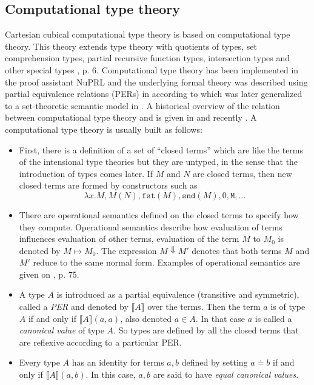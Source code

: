 \documentclass[12pt,a4paper,twoside,xetex]{book} %
\newcommand{\keyword}[1]{\emph{#1}\index{#1}}
\begin{document}
\subsection{Computational type theory}

Cartesian cubical computational type theory is based on computational type theory. This theory extends type theory with quotients of types, set 
comprehension types, partial recursive function types, intersection types and 
other special types \cite{Constable2011}, p. 6.  Computational type theory has 
been implemented in the proof assistant NuPRL and the underlying formal theory 
was described using partial equivalence relations (PERs) in \cite{Allen1987} 
according to \cite{Angiuli2018} which was later generalized to a set-theoretic semantic model in 
\cite{Harper1991}. A historical overview of the relation between computational type theory and  is given in \cite{Constable2003} and recently 
\cite{Constable2015July}. A computational type theory is usually built as 
follows:

\begin{itemize}
 \item First, there is a definition of a set of ``closed terms'' which are like 
the terms of the intensional type theories but they are untyped, in the sense 
that the introduction of types comes later. If $M$ and $N$ are closed terms, 
then new closed terms are formed by constructors such as $$\lambda x . M, M (N), 
\texttt{fst}(M), \texttt{snd}(M), 0, \texttt{M}, ...$$ 
 
 \item There are operational semantics defined on the closed terms to specify 
how they compute. Operational semantics describe how evaluation of terms 
influences evaluation of other terms, evaluation of the term $M$ to $M_0$ is 
denoted by $M \mapsto M_0$. The expression $M \Downarrow M'$ denotes that both 
terms $M$ and $M'$ reduce to the same normal form. Examples of operational 
semantics are given on \cite{Harper1991}, p. 75.
 
 \item A type $A$ is introduced as a partial equivalence (transitive and 
symmetric), called a \keyword{PER} and denoted by $\llbracket A \rrbracket$ 
over the terms. Then the term $a$ is of type $A$ if and only if $\llbracket A 
\rrbracket (a,a)$, also denoted $a \in A$. In that case $a$ is called a 
\keyword{canonical value} of type $A$. So types are defined by all the closed 
terms that are reflexive according to a particular PER. 
 
 \item Every type $A$ has an identity for terms $a,b$ defined by 
setting $a \doteq b$ if and only if $\llbracket A \rrbracket (a,b)$. In this 
case, $a,b$ are said to have \keyword{equal canonical values}.

\end{itemize}
\end{document}
